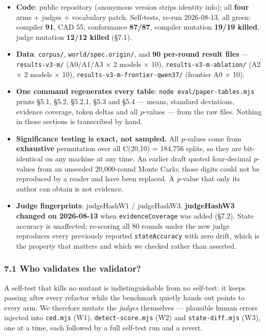 \documentclass[
  english,
]{article}
\providecommand{\tightlist}{%
  \setlength{\itemsep}{0pt}\setlength{\parskip}{0pt}}
\begin{document}
\begin{itemize}
\tightlist
\item
  \textbf{Code}: public repository (anonymous version strips identity
  info); all \textbf{four} arms + judges + vocabulary patch. Self-tests,
  re-run 2026-08-13, all green: compiler \textbf{91}, CAD 55,
  conformance \textbf{87/87}, compiler mutation \textbf{19/19 killed},
  judge mutation \textbf{12/12 killed} (§7.1).
\item
  \textbf{Data}: \texttt{corpus/}, \texttt{world/spec.origin/}, and
  \textbf{90 per-round result files} --- \texttt{results-v3-m/}
  (A0/A1/A3 × 2 models × 10), \texttt{results-v3-m-ablation/} (A2 × 2
  models × 10), \texttt{results-v3-m-frontier-qwen37/} (frontier A0 ×
  10).
\item
  \textbf{One command regenerates every table}:
  \texttt{node\ eval/paper-tables.mjs} prints §5.1, §5.2, §5.2.1, §5.3
  and §5.4 --- means, standard deviations, evidence coverage, token
  deltas and all \emph{p}-values --- from the raw files. Nothing in
  those sections is transcribed by hand.
\item
  \textbf{Significance testing is exact, not sampled.} All
  \emph{p}-values come from \textbf{exhaustive} permutation over all
  C(20,10) = 184,756 splits, so they are bit-identical on any machine at
  any time. An earlier draft quoted four-decimal \emph{p}-values from an
  unseeded 20,000-round Monte Carlo; those digits could not be
  reproduced by a reader and have been replaced. A \emph{p}-value that
  only its author can obtain is not evidence.
\item
  \textbf{Judge fingerprints}: judgeHashW1 / judgeHashW3.
  \textbf{judgeHashW3 changed on 2026-08-13} when
  \texttt{evidenceCoverage} was added (§7.2). State accuracy is
  unaffected: re-scoring all 80 rounds under the new judge reproduces
  every previously reported \texttt{stateAccuracy} with zero drift,
  which is the property that matters and which we checked rather than
  asserted.
\end{itemize}

\subsubsection{7.1 Who validates the
validator?}\label{who-validates-the-validator}

A self-test that kills no mutant is indistinguishable from no self-test:
it keeps passing after every refactor while the benchmark quietly hands
out points to every arm. We therefore mutate the \emph{judges}
themselves --- plausible human errors injected into \texttt{ced.mjs}
(W1), \texttt{detect-score.mjs} (W2) and \texttt{state-diff.mjs} (W3),
one at a time, each followed by a full self-test run and a revert.
\end{document}
